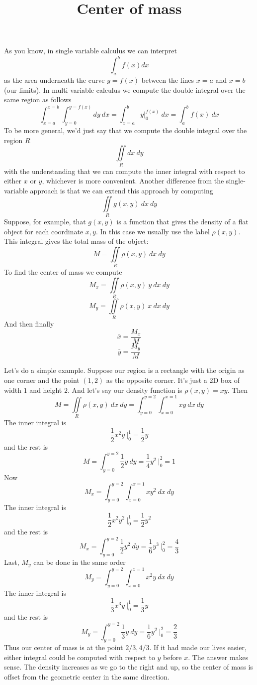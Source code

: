 \documentclass[11pt, oneside]{article}
\title{Center of mass}
\date{}
\begin{document}
\maketitle
\Large



As you know, in single variable calculus we can interpret
\[ \int_a^b f(x) dx \]
as the area underneath the curve $y=f(x)$ between the lines $x=a$ and $x=b$ (our limits).  In multi-variable calculus we compute the double integral over the same region as follows
\[ \int_{x=a}^{x=b} \int_{y=0}^{y=f(x)} dy \ dx =  \int_{x=a}^b y \bigg |_0^{f(x)}  \ dx = \int_a^b f(x) \ dx \]
To be more general, we'd just say that we compute the double integral over the region $R$
\[ \iint\limits_{R} dx \ dy  \]
with the understanding that we can compute the inner integral with respect to either $x$ or $y$, whichever is more convenient.
Another difference from the single-variable approach is that we can extend this approach by computing
\[ \iint\limits_{R} g(x,y) \ dx \ dy  \]
Suppose, for example, that $g(x,y)$ is a function that gives the density of a flat object for each coordinate $x,y$.  In this case we usually use the label $\rho (x,y)$.  This integral gives the total mass of the object:
\[ M = \iint\limits_{R} \rho (x,y) \ dx \ dy  \]
To find the center of mass we compute
\[ M_x = \iint\limits_{R} \rho (x,y)\  y \ dx \ dy  \]
\[ M_y = \iint\limits_{R} \rho (x,y) \ x \ dx \ dy \]
And then finally 
\[ \bar{x} = \frac{M_x}{M} \]
\[ \bar{y} = \frac{M_y}{M} \]
\vspace{5 mm}

\noindent
Let's do a simple example.  Suppose our region is a rectangle with the origin as one corner and the point $(1,2)$ as the opposite corner.  It's just a 2D box of width $1$ and height $2$.  And let's say our density function is $\rho (x,y) = xy$.  Then
\[ M = \iint\limits_{R} \rho (x,y) \ dx \ dy =  \int_{y=0}^{y=2} \int_{x=0}^{x=1} xy \ dx \ dy  \]
The inner integral is
\[ \frac{1}{2} x^2 y \ \bigg |_0^{1} = \frac{1}{2} y \]
and the rest is
\[ M = \int_{y=0}^{y=2} \frac{1}{2} y \ dy = \frac{1}{4} y^2 \  \bigg |_0^{2} = 1 \]
Now
\[ M_x =  \int_{y=0}^{y=2} \int_{x=0}^{x=1} xy^2 \ dx \ dy  \]
The inner integral is
\[ \frac{1}{2} x^2 y^2 \ \bigg |_0^{1} = \frac{1}{2} y^2 \]
and the rest is
\[ M_x  = \int_{y=0}^{y=2} \frac{1}{2} y^2 \ dy = \frac{1}{6} y^3 \  \bigg |_0^{2} = \frac{4}{3} \]
Last, $M_y$ can be done in the same order
\[ M_y =  \int_{y=0}^{y=2} \int_{x=0}^{x=1} x^2y \ dx \ dy  \]
The inner integral is
\[ \frac{1}{3} x^3 y \ \bigg |_0^{1} = \frac{1}{3} y \]
and the rest is
\[ M_y  = \int_{y=0}^{y=2} \frac{1}{3} y \ dy = \frac{1}{6} y^2 \  \bigg |_0^{2} = \frac{2}{3} \]
Thus our center of mass is at the point $2/3,4/3$.  If it had made our lives easier, either integral could be computed with respect to $y$ before $x$.
The answer makes sense.  The density increases as we go to the right and up, so the center of mass is offset from the geometric center in the same direction.
\end{document}

